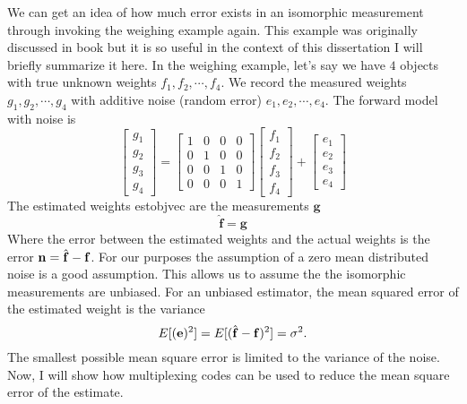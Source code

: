 We can get an idea of how much error exists in an isomorphic measurement through invoking the weighing example again. This example was originally discussed in book \cite{harwit2012hadamard} but it is so useful in the context of this dissertation I will briefly summarize it here. In the weighing example, let's say we have $4$ objects with true unknown weights $f_{1}, f_{2}, \cdots, f_{4}$. We record the measured weights $g_{1}, g_{2}, \cdots, g_{4}$ with additive noise (random error)  $ e_1, e_2, \cdots, e_4 $. The forward model with noise is 
\begin{equation}
	\left[ \begin{matrix} g_1\\ g_2\\ g_3\\ g_4\end{matrix} \right] = \left[ \begin{matrix} 1& 0& 0& 0\\ 0& 1& 0& 0\\ 0& 0& 1& 0\\ 0& 0& 0& 1\end{matrix} \right] \left[ \begin{matrix} f_1\\ f_2\\ f_3\\ f_4\end{matrix} \right] + \left[ \begin{matrix} e_1\\ e_2\\ e_3\\ e_4\end{matrix} \right] 
	\label{eq:gHfpluse}
\end{equation}
The estimated weights \gls{estobjvec} are the measurements  $ \mathbf{g} $
\begin{equation}
	\mathbf{ \hat{ f }} = \mathbf{g} 
\end{equation}
Where the error between the estimated weights and the actual weights is the error $ \mathbf{n} = \hat{ \mathbf{f} } - \mathbf{f} $. For our purposes the assumption of a zero mean distributed noise is a good assumption. This allows us to assume the the isomorphic measurements are unbiased. For an unbiased estimator, the mean squared error of the estimated weight is the variance
\begin{equation}
	E [ ( \mathbf{e} )^2 ] = E [ ( \hat{ \mathbf{f} } - \mathbf{f} )^2 ] = \sigma^2.
\end{equation}
The smallest possible mean square error is limited to the variance of the noise. Now, I will show how multiplexing codes can be used to reduce the mean square error of the estimate. 

